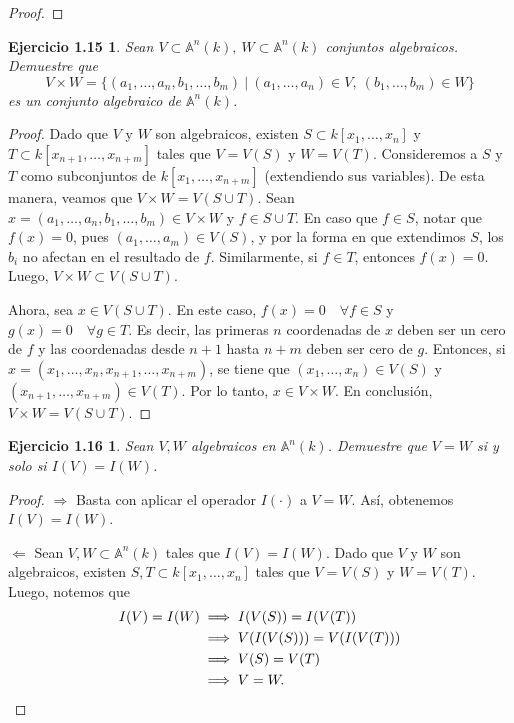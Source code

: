 \documentclass{amsart}
\theoremstyle{plain}
\newtheorem*{ejercicio3}{Ejercicio 1.15}
\newtheorem*{ejercicio4}{Ejercicio 1.16}
\begin{document}
\begin{proof}
	\end{proof}

	\begin{ejercicio3}
		Sean $V \subset \mathbb{A}^{n}(k),\ W \subset \mathbb{A}^{n}(k)$ conjuntos algebraicos. Demuestre que
		\[ V \times W = \{(a_{1},\dots,a_{n},b_{1},\dots,b_{m}) \ | \ (a_{1},\dots,a_{n}) \in V,\ (b_{1},\dots,b_{m}) \in W\} \]
		es un conjunto algebraico de $\mathbb{A}^{n}(k)$.
	\end{ejercicio3}
	\begin{proof}
		Dado que $V$ y $W$ son algebraicos, existen $S \subset k[x_{1},\dots,x_{n}]$ y $T \subset k[x_{n + 1},\dots,x_{n + m}]$ tales que $V = V(S)$ y $W = V(T)$. Consideremos a $S$ y $T$ como subconjuntos de $k[x_{1},\dots,x_{n + m}]$ (extendiendo sus variables). De esta manera, veamos que $V \times W = V(S \cup T)$. Sean $x = (a_{1},\dots,a_{n},b_{1},\dots,b_{m}) \in V \times W$ y $f \in S \cup T$. En caso que $f \in S$, notar que $f(x) = 0$, pues $(a_{1},\dots,a_{m}) \in V(S)$, y por la forma en que extendimos $S$, los $b_{i}$ no afectan en el resultado de $f$. Similarmente, si $f \in T$, entonces $f(x) = 0$. Luego, $V \times W \subset V(S \cup T)$. \par
		Ahora, sea $x \in V(S \cup T)$. En este caso, $f(x) = 0 \quad \forall f \in S$ y $g(x) = 0 \quad \forall g \in T$. Es decir, las primeras $n$ coordenadas de $x$ deben ser un cero de $f$ y las coordenadas desde $n + 1$ hasta $n + m$ deben ser cero de $g$. Entonces, si $x = (x_{1},\dots,x_{n},x_{n + 1},\dots,x_{n + m})$, se tiene que $(x_{1},\dots,x_{n}) \in V(S)$ y $(x_{n + 1},\dots,x_{n + m}) \in V(T)$. Por lo tanto, $x \in V \times W$. En conclusión, $V \times W = V(S \cup T)$.
	\end{proof}

	\begin{ejercicio4}
		Sean $V,W$ algebraicos en $\mathbb{A}^{n}(k)$. Demuestre que $V = W$ si y solo si $I(V) = I(W)$.
	\end{ejercicio4}
	\begin{proof}
		$\boxed{\Rightarrow}$ Basta con aplicar el operador $I(\cdot)$ a $V = W$. Así, obtenemos $I(V) = I(W)$. \par
		$\boxed{\Leftarrow}$ Sean $V,W \subset \mathbb{A}^{n}(k)$ tales que $I(V) = I(W)$. Dado que $V$ y $W$ son algebraicos, existen $S,T \subset k[x_{1},\dots,x_{n}]$ tales que $V = V(S)$ y $W = V(T)$. Luego, notemos que
		\begin{align*}
			I(V) = I(W) &\implies I(V(S)) = I(V(T)) \\
			&\implies V(I(V(S))) = V(I(V(T))) \\
			&\implies V(S) = V(T) \\
			&\implies V = W
		.\qedhere\end{align*}
	\end{proof}
	
\end{document}
